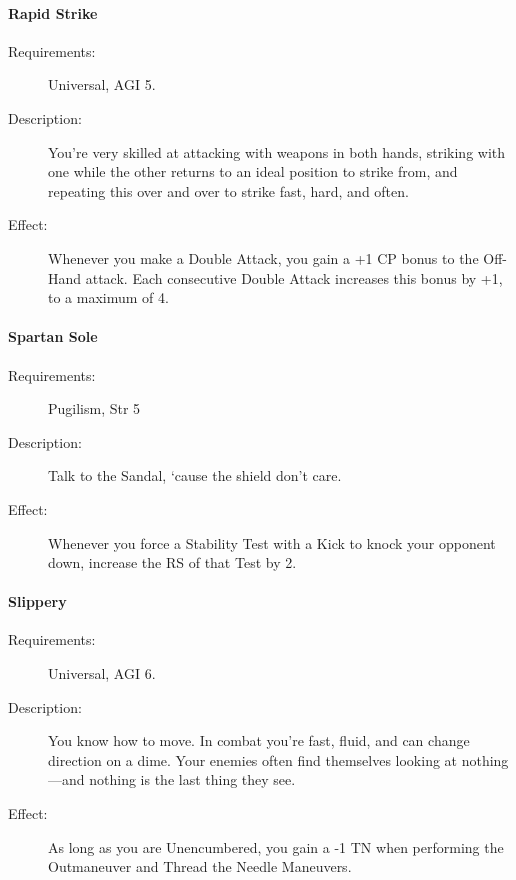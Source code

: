 \documentclass[oneside,11pt,english]{book}
\begin{document}
\paragraph{\label{talent:Rapid Strike}Rapid Strike}
\begin{description}
\item [Requirements:] Universal, AGI 5. 
\item [Description:] You're very skilled at attacking with weapons in both hands, striking with one while the other returns to an ideal position to strike from, and repeating this over and over to strike fast, hard, and often.
\item [Effect:] Whenever you make a Double Attack, you gain a +1 CP bonus to the Off-Hand attack. Each consecutive Double Attack increases this bonus by +1, to a maximum of 4. 
  
\end{description}
\paragraph{\label{talent:Spartan Sole}Spartan Sole}
\begin{description}
\item [Requirements:] Pugilism, Str 5 
\item [Description:] Talk to the Sandal, ‘cause the shield don’t care. 
\item [Effect:] Whenever you force a Stability Test with a Kick to knock your opponent down, increase the RS of that Test by 2. 
  
\end{description}
\paragraph{\label{talent:Slippery}Slippery}
\begin{description}
\item [Requirements:] Universal, AGI 6. 
\item [Description:] You know how to move. In combat you're fast, fluid, and can change direction on a dime. 
  Your enemies often find themselves looking at nothing—and nothing is the last thing they see. 
\item [Effect:] As long as you are Unencumbered, you gain a -1 TN when performing the Outmaneuver and Thread the Needle Maneuvers.
  
\end{description}
\end{document}
